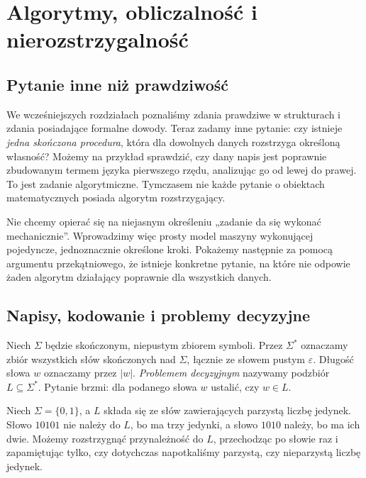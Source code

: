 \chapter[Algorytmy i obliczalność]{Algorytmy, obliczalność i nierozstrzygalność}
\label{ch:computability-intro}

\section{Pytanie inne niż prawdziwość}
We wcześniejszych rozdziałach poznaliśmy zdania prawdziwe
w strukturach i zdania posiadające formalne dowody.
Teraz zadamy inne pytanie: czy istnieje \emph{jedna skończona procedura},
która dla dowolnych danych rozstrzyga określoną własność?
Możemy na przykład sprawdzić, czy dany napis jest poprawnie zbudowanym
termem języka pierwszego rzędu, analizując go od lewej do prawej.
To jest zadanie algorytmiczne. Tymczasem nie każde pytanie
o obiektach matematycznych posiada algorytm rozstrzygający.

Nie chcemy opierać się na niejasnym określeniu
„zadanie da się wykonać mechanicznie”. Wprowadzimy więc prosty model
maszyny wykonującej pojedyncze, jednoznacznie określone kroki.
Pokażemy następnie za pomocą argumentu przekątniowego,
że istnieje konkretne pytanie, na które nie odpowie
żaden algorytm działający poprawnie dla wszystkich danych.

\section{Napisy, kodowanie i problemy decyzyjne}
\begin{definicja}
Niech $\Sigma$ będzie skończonym, niepustym zbiorem symboli.
Przez $\Sigma^*$ oznaczamy zbiór wszystkich słów skończonych
nad $\Sigma$, łącznie ze słowem pustym $\varepsilon$.
Długość słowa $w$ oznaczamy przez $|w|$.
\emph{Problemem decyzyjnym} nazywamy podzbiór $L\subseteq\Sigma^*$.
Pytanie brzmi: dla podanego słowa $w$ ustalić, czy $w\in L$.
\end{definicja}

\begin{przyklad}
Niech $\Sigma=\{0,1\}$, a $L$ składa się ze słów
zawierających parzystą liczbę jedynek.
Słowo $10101$ nie należy do $L$, bo ma trzy jedynki,
a słowo $1010$ należy, bo ma ich dwie.
Możemy rozstrzygnąć przynależność do $L$,
przechodząc po słowie raz i zapamiętując tylko,
czy dotychczas napotkaliśmy parzystą, czy nieparzystą liczbę jedynek.
\end{przyklad}

